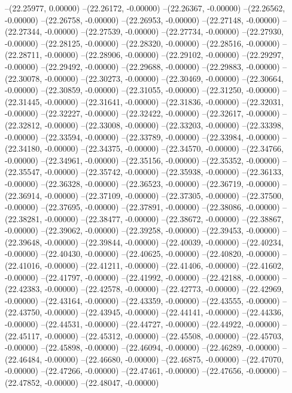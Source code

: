 --(22.25977, 0.00000)
--(22.26172, -0.00000)
--(22.26367, -0.00000)
--(22.26562, -0.00000)
--(22.26758, -0.00000)
--(22.26953, -0.00000)
--(22.27148, -0.00000)
--(22.27344, -0.00000)
--(22.27539, -0.00000)
--(22.27734, -0.00000)
--(22.27930, -0.00000)
--(22.28125, -0.00000)
--(22.28320, -0.00000)
--(22.28516, -0.00000)
--(22.28711, -0.00000)
--(22.28906, -0.00000)
--(22.29102, -0.00000)
--(22.29297, -0.00000)
--(22.29492, -0.00000)
--(22.29688, -0.00000)
--(22.29883, -0.00000)
--(22.30078, -0.00000)
--(22.30273, -0.00000)
--(22.30469, -0.00000)
--(22.30664, -0.00000)
--(22.30859, -0.00000)
--(22.31055, -0.00000)
--(22.31250, -0.00000)
--(22.31445, -0.00000)
--(22.31641, -0.00000)
--(22.31836, -0.00000)
--(22.32031, -0.00000)
--(22.32227, -0.00000)
--(22.32422, -0.00000)
--(22.32617, -0.00000)
--(22.32812, -0.00000)
--(22.33008, -0.00000)
--(22.33203, -0.00000)
--(22.33398, -0.00000)
--(22.33594, -0.00000)
--(22.33789, -0.00000)
--(22.33984, -0.00000)
--(22.34180, -0.00000)
--(22.34375, -0.00000)
--(22.34570, -0.00000)
--(22.34766, -0.00000)
--(22.34961, -0.00000)
--(22.35156, -0.00000)
--(22.35352, -0.00000)
--(22.35547, -0.00000)
--(22.35742, -0.00000)
--(22.35938, -0.00000)
--(22.36133, -0.00000)
--(22.36328, -0.00000)
--(22.36523, -0.00000)
--(22.36719, -0.00000)
--(22.36914, -0.00000)
--(22.37109, -0.00000)
--(22.37305, -0.00000)
--(22.37500, -0.00000)
--(22.37695, -0.00000)
--(22.37891, -0.00000)
--(22.38086, -0.00000)
--(22.38281, -0.00000)
--(22.38477, -0.00000)
--(22.38672, -0.00000)
--(22.38867, -0.00000)
--(22.39062, -0.00000)
--(22.39258, -0.00000)
--(22.39453, -0.00000)
--(22.39648, -0.00000)
--(22.39844, -0.00000)
--(22.40039, -0.00000)
--(22.40234, -0.00000)
--(22.40430, -0.00000)
--(22.40625, -0.00000)
--(22.40820, -0.00000)
--(22.41016, -0.00000)
--(22.41211, -0.00000)
--(22.41406, -0.00000)
--(22.41602, -0.00000)
--(22.41797, -0.00000)
--(22.41992, -0.00000)
--(22.42188, -0.00000)
--(22.42383, -0.00000)
--(22.42578, -0.00000)
--(22.42773, -0.00000)
--(22.42969, -0.00000)
--(22.43164, -0.00000)
--(22.43359, -0.00000)
--(22.43555, -0.00000)
--(22.43750, -0.00000)
--(22.43945, -0.00000)
--(22.44141, -0.00000)
--(22.44336, -0.00000)
--(22.44531, -0.00000)
--(22.44727, -0.00000)
--(22.44922, -0.00000)
--(22.45117, -0.00000)
--(22.45312, -0.00000)
--(22.45508, -0.00000)
--(22.45703, -0.00000)
--(22.45898, -0.00000)
--(22.46094, -0.00000)
--(22.46289, -0.00000)
--(22.46484, -0.00000)
--(22.46680, -0.00000)
--(22.46875, -0.00000)
--(22.47070, -0.00000)
--(22.47266, -0.00000)
--(22.47461, -0.00000)
--(22.47656, -0.00000)
--(22.47852, -0.00000)
--(22.48047, -0.00000)

